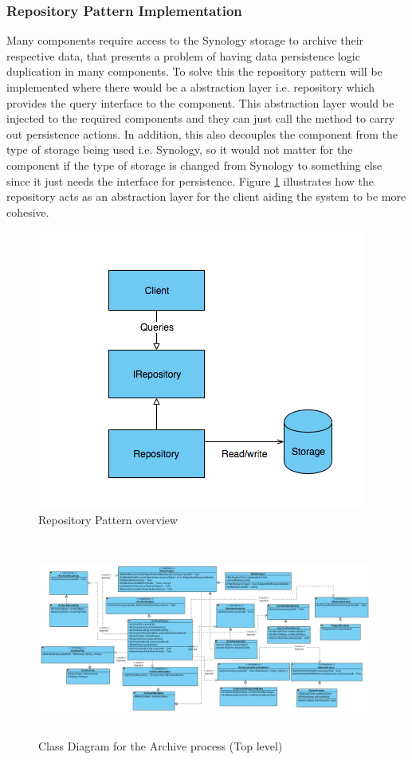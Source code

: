 \subsubsection{Repository Pattern Implementation}
Many components require access to the Synology storage to archive their respective data, that presents a problem of having data
persistence logic duplication in many components. To solve this the repository pattern will be implemented where there would be a abstraction layer i.e. repository which
provides the query interface to the component. This abstraction layer would be injected to the required components and they can just call the 
method to carry out persistence actions. In addition, this also decouples the component from the type of storage being used i.e. Synology, so it would not
matter for the component if the type of storage is changed from Synology to something else since it just needs the interface for persistence. Figure 
\ref{fig:repositoryPattern} illustrates how the repository acts as an abstraction layer for the client aiding the system to be more cohesive. 
\begin{figure}[H]
    \centering \includegraphics[scale=0.7]{grafiken/repositoryPattern.png}
    \caption{Repository Pattern overview}
    \label{fig:repositoryPattern}
\end{figure}


\begin{figure}[H]
    \centering \includegraphics[height=6.5cm, angle=90, origin=c, width=11cm]{grafiken/archiveClass.png}
    \caption{Class Diagram for the Archive process (Top level)}
    \label{fig:archiveClassDiagram}
\end{figure}
